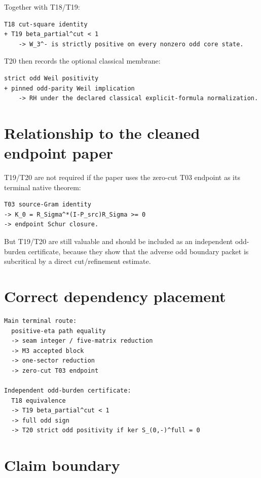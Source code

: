 Together with T18/T19:

\begin{verbatim}
T18 cut-square identity
+ T19 beta_partial^cut < 1
    -> W_3^- is strictly positive on every nonzero odd core state.
\end{verbatim}

T20 then records the optional classical membrane:

\begin{verbatim}
strict odd Weil positivity
+ pinned odd-parity Weil implication
    -> RH under the declared classical explicit-formula normalization.
\end{verbatim}

\hypertarget{relationship-to-the-cleaned-endpoint-paper}{%
\section{Relationship to the cleaned endpoint paper}\label{relationship-to-the-cleaned-endpoint-paper}}

T19/T20 are not required if the paper uses the zero-cut T03 endpoint as its terminal native theorem:

\begin{verbatim}
T03 source-Gram identity
-> K_0 = R_Sigma^*(I-P_src)R_Sigma >= 0
-> endpoint Schur closure.
\end{verbatim}

But T19/T20 are still valuable and should be included as an independent odd-burden certificate, because they show that the adverse odd boundary packet is subcritical by a direct cut/refinement estimate.

\hypertarget{correct-dependency-placement}{%
\section{Correct dependency placement}\label{correct-dependency-placement}}

\begin{verbatim}
Main terminal route:
  positive-eta path equality
  -> seam integer / five-matrix reduction
  -> M3 accepted block
  -> one-sector reduction
  -> zero-cut T03 endpoint

Independent odd-burden certificate:
  T18 equivalence
  -> T19 beta_partial^cut < 1
  -> full odd sign
  -> T20 strict odd positivity if ker S_(0,-)^full = 0
\end{verbatim}

\hypertarget{claim-boundary}{%
\section{Claim boundary}\label{claim-boundary}}

